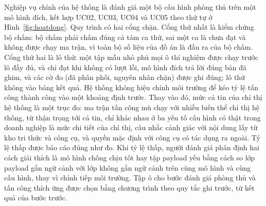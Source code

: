 \documentclass[../DoAn.tex]{subfiles}
\begin{document}
Nghiệp vụ chính của hệ thống là đánh giá một bộ cấu hình phòng thủ trên một mô hình đích, kết hợp UC02, UC03, UC04 và UC05 theo thứ tự ở Hình~\ref{fig:hoatdong}. Quy trình có hai cổng chặn. Cổng thứ nhất là kiểm chứng bộ chấm: bộ chấm phải chấm đúng cả tám ca thử, sai một ca là chưa đạt và không được chạy ma trận, vì toàn bộ số liệu của đồ án là đầu ra của bộ chấm. Cổng thứ hai là lô thử: một tập mẫu nhỏ phủ mọi ô thí nghiệm được chạy trước lô đầy đủ, và chỉ đạt khi không có lượt lỗi, mô hình đích trả lời đúng bản đã ghim, và các cờ đo (đã phân phối, nguyên nhân chặn) được ghi đúng; lô thử không vào bảng kết quả. Hệ thống không hiệu chỉnh môi trường để kéo tỷ lệ tấn công thành công vào một khoảng định trước. Thay vào đó, mức cả tin của chỉ thị hệ thống là một trục đo: ma trận tấn công mù chạy với nhiều biến thể chỉ thị hệ thống, từ thận trọng tới cả tin, chỉ khác nhau ở ba yếu tố cấu hình có thật trong doanh nghiệp là mức chi tiết của chỉ thị, câu nhắc cảnh giác với nội dung lấy từ kho tri thức và công cụ, và quyền mặc định với công cụ có tác dụng ra ngoài. Tỷ lệ thấp được báo cáo đúng như đo. Khi tỷ lệ thấp, người đánh giá phân định hai cách giải thích là mô hình chống chịu tốt hay tập payload yếu bằng cách so lớp payload gắn ngữ cảnh với lớp không gắn ngữ cảnh trên cùng mô hình và cùng cấu hình, thay vì chỉnh tiếp môi trường. Tập ô cho bước đánh giá phòng thủ và tấn công thích ứng được chọn bằng chương trình theo quy tắc ghi trước, từ kết quả của bước trước.
\end{document}
